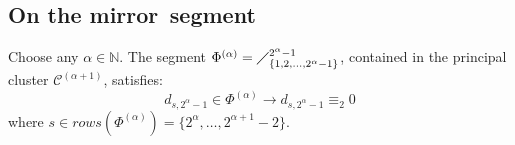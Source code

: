 \subsection{On the \flqq mirror\frqq\, segment}

\begin{theorem}
    Choose any $\alpha\in\mathbb{N}$. 
    The segment $\Phi^{(\alpha)}=\diagup_{\lbrace 1,2,\ldots,2^{\alpha}-1\rbrace}^{2^{\alpha}-1}$, contained 
    in the principal cluster $\mathcal{C}^{(\alpha+1)}$, satisfies: 
    \begin{displaymath}
        d_{s,2^{\alpha}-1}\in\Phi^{(\alpha)} \rightarrow d_{s,2^{\alpha}-1}\equiv_{2}0
    \end{displaymath}
    where $s\in rows\left(\Phi^{(\alpha)}\right)=\lbrace2^{\alpha},\ldots,2^{\alpha+1}-2\rbrace$.
\end{theorem}

